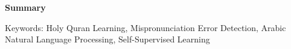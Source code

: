 \cleardoublepage
\newpage
\thispagestyle{empty}
{}



\begin{center}\huge \textbf{Summary}\end{center}


%
%
%
%
%
%
%
%
%
%
%
%
%
%
%
%
%
%
%
%
%
%

\vfill 

\begin{flushleft}
\large

Keywords: Holy Quran Learning, Mispronunciation Error Detection, Arabic Natural Language Processing, Self-Supervised Learning
\end{flushleft}




